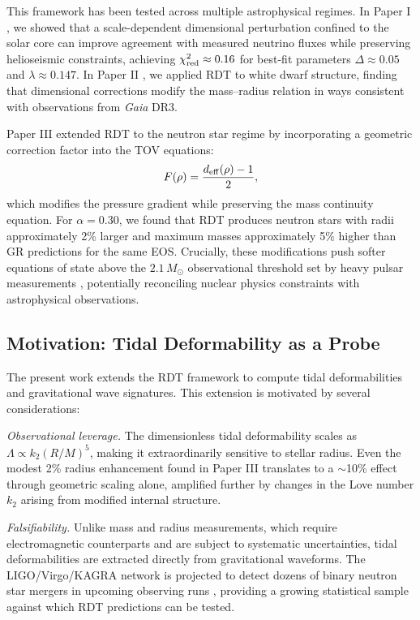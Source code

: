 \documentclass[twocolumn,showpacs,preprintnumbers,amsmath,amssymb,prd]{revtex4-2}
\begin{document}
This framework has been tested across multiple astrophysical regimes. In Paper I \cite{Merrill2024a}, we showed that a scale-dependent dimensional perturbation confined to the solar core can improve agreement with measured neutrino fluxes while preserving helioseismic constraints, achieving $\chi^2_{\rm red} \approx 0.16$ for best-fit parameters $\Delta \approx 0.05$ and $\lambda \approx 0.147$. In Paper II \cite{Merrill2024b}, we applied RDT to white dwarf structure, finding that dimensional corrections modify the mass--radius relation in ways consistent with observations from \textit{Gaia} DR3.

Paper III \cite{Merrill2024c} extended RDT to the neutron star regime by incorporating a geometric correction factor into the TOV equations:
\begin{equation}
F(\rho) = \frac{d_{\rm eff}(\rho) - 1}{2},
\label{eq:F_factor}
\end{equation}
which modifies the pressure gradient while preserving the mass continuity equation. For $\alpha = 0.30$, we found that RDT produces neutron stars with radii approximately 2\% larger and maximum masses approximately 5\% higher than GR predictions for the same EOS. Crucially, these modifications push softer equations of state above the $2.1\,M_\odot$ observational threshold set by heavy pulsar measurements \cite{Cromartie2020,Fonseca2021}, potentially reconciling nuclear physics constraints with astrophysical observations.

\subsection{Motivation: Tidal Deformability as a Probe}
\label{sec:intro_motivation}

The present work extends the RDT framework to compute tidal deformabilities and gravitational wave signatures. This extension is motivated by several considerations:

\textit{Observational leverage.} The dimensionless tidal deformability scales as $\Lambda \propto k_2 (R/M)^5$, making it extraordinarily sensitive to stellar radius. Even the modest 2\% radius enhancement found in Paper III translates to a $\sim$10\% effect through geometric scaling alone, amplified further by changes in the Love number $k_2$ arising from modified internal structure.

\textit{Falsifiability.} Unlike mass and radius measurements, which require electromagnetic counterparts and are subject to systematic uncertainties, tidal deformabilities are extracted directly from gravitational waveforms. The LIGO/Virgo/KAGRA network is projected to detect dozens of binary neutron star mergers in upcoming observing runs \cite{Abbott2020prospects}, providing a growing statistical sample against which RDT predictions can be tested.
\end{document}
